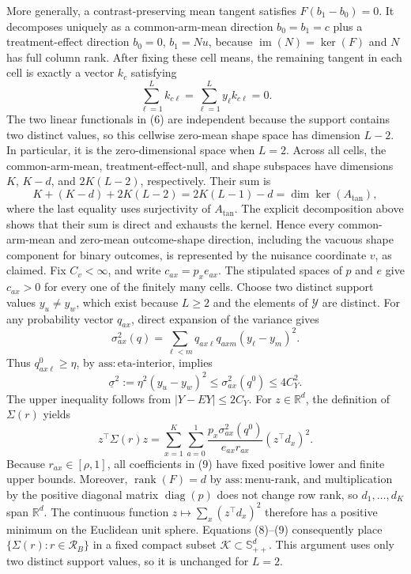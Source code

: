 More generally, a contrast-preserving mean tangent satisfies \(F(b_1-b_0)=0\). It decomposes uniquely as a common-arm-mean direction \(b_0=b_1=c\) plus a treatment-effect direction \(b_0=0\), \(b_1=Nu\), because \(\operatorname{im}(N)=\ker(F)\) and \(N\) has full column rank. After fixing these cell means, the remaining tangent in each cell is exactly a vector \(k_c\) satisfying
\[
\sum_{\ell=1}^L k_{c\ell}=\sum_{\ell=1}^L y_\ell k_{c\ell}=0.
\tag{6}
\]
The two linear functionals in (6) are independent because the support contains two distinct values, so this cellwise zero-mean shape space has dimension \(L-2\). In particular, it is the zero-dimensional space when \(L=2\). Across all cells, the common-arm-mean, treatment-effect-null, and shape subspaces have dimensions \(K\), \(K-d\), and \(2K(L-2)\), respectively. Their sum is
\[
K+(K-d)+2K(L-2)=2K(L-1)-d=\dim\ker(A_{\mathrm{tan}}),
\]
where the last equality uses surjectivity of \(A_{\mathrm{tan}}\). The explicit decomposition above shows that their sum is direct and exhausts the kernel. Hence every common-arm-mean and zero-mean outcome-shape direction, including the vacuous shape component for binary outcomes, is represented by the nuisance coordinate \(v\), as claimed.
Fix \(C_v<\infty\), and write \(c_{ax}=p_xe_{ax}\). The stipulated spaces of \(p\) and \(e\) give \(c_{ax}>0\) for every one of the finitely many cells. Choose two distinct support values \(y_u\ne y_w\), which exist because \(L\ge2\) and the elements of \(\mathcal Y\) are distinct. For any probability vector \(q_{ax}\), direct expansion of the variance gives
\[
\sigma^2_{ax}(q)=\sum_{\ell<m}q_{ax\ell}q_{axm}(y_\ell-y_m)^2.
\tag{7}
\]
Thus \(q^0_{ax\ell}\ge\eta\), by \(\mathrm{ass:eta\text{-}interior}\), implies
\[
\underline\sigma^2:=\eta^2(y_u-y_w)^2
\le \sigma^2_{ax}(q^0)\le 4C_Y^2.
\tag{8}
\]
The upper inequality follows from \(|Y-EY|\le2C_Y\). For \(z\in\mathbb R^d\), the definition of \(\Sigma(r)\) yields
\[
z^\top\Sigma(r)z
=\sum_{x=1}^K\sum_{a=0}^1
\frac{p_x\sigma^2_{ax}(q^0)}{e_{ax}r_{ax}}(z^\top d_x)^2.
\tag{9}
\]
Because \(r_{ax}\in[\rho,1]\), all coefficients in (9) have fixed positive lower and finite upper bounds. Moreover, \(\operatorname{rank}(F)=d\) by \(\mathrm{ass:menu\text{-}rank}\), and multiplication by the positive diagonal matrix \(\operatorname{diag}(p)\) does not change row rank, so \(d_1,\ldots,d_K\) span \(\mathbb R^d\). The continuous function \(z\mapsto\sum_x(z^\top d_x)^2\) therefore has a positive minimum on the Euclidean unit sphere. Equations (8)--(9) consequently place \(\{\Sigma(r):r\in\mathcal R_B\}\) in a fixed compact subset \(\mathcal K\subset\mathbb S_{++}^d\). This argument uses only two distinct support values, so it is unchanged for \(L=2\).

